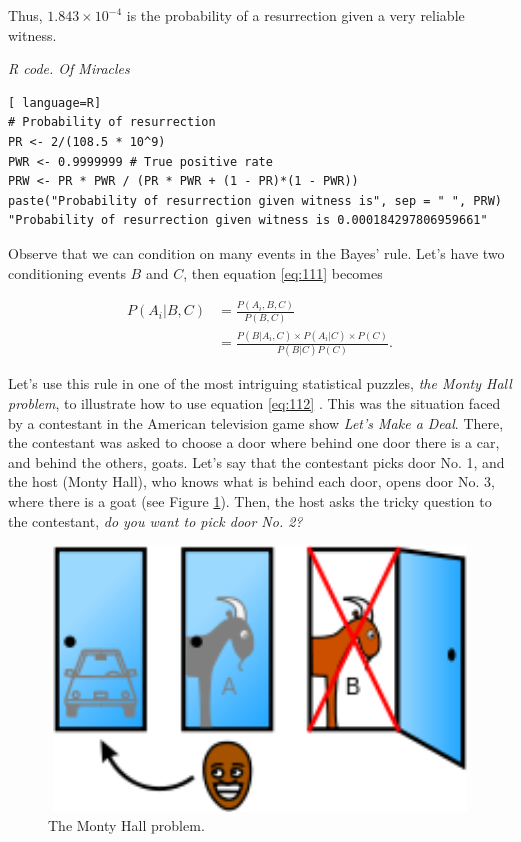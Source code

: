 Thus, $1.843\times 10^{-4}$ is the probability of a resurrection given a very reliable witness.

\begin{tcolorbox}[enhanced,width=4.67in,center upper,
	fontupper=\large\bfseries,drop shadow southwest,sharp corners]
\textit{R code. Of Miracles}
\begin{VF}
\begin{lstlisting}[ language=R]
# Probability of resurrection
PR <- 2/(108.5 * 10^9) 
PWR <- 0.9999999 # True positive rate
PRW <- PR * PWR / (PR * PWR + (1 - PR)*(1 - PWR)) 
paste("Probability of resurrection given witness is", sep = " ", PRW)
"Probability of resurrection given witness is 0.000184297806959661"
\end{lstlisting}
\end{VF}
\end{tcolorbox}

Observe that we can condition on many events in the Bayes' rule. Let's have two conditioning events $B$ and $C$, then equation \ref{eq:111} becomes

\begin{align}
	P(A_i|B,C)&=\frac{P(A_i,B,C)}{P(B,C)}\nonumber\\
	&=\frac{P(B|A_i,C) \times P(A_i|C) \times P(C)}{P(B|C)P(C)}.
	\label{eq:112}
\end{align}

Let's use this rule in one of the most intriguing statistical puzzles, \textit{the Monty Hall problem}, to illustrate how to use equation \ref{eq:112} \cite{selvin1975problem,selvin1975bproblem}. This was the situation faced by a contestant in the American television game show \textit{Let's Make a Deal}. There, the contestant was asked to choose a door where behind one door there is a car, and behind the others, goats. Let's say that the contestant picks door No. 1, and the host (Monty Hall), who knows what is behind each door, opens door No. 3, where there is a goat (see Figure \ref{fig11}). Then, the host asks the tricky question to the contestant, \textit{do you want to pick door No. 2?}

\begin{figure}
	\includegraphics[width=340pt, height=200pt]{Chapters/chapter1/figures/MHproblem.png}
	\caption[List of figure caption goes here]{The Monty Hall problem.}\label{fig11}
\end{figure}

